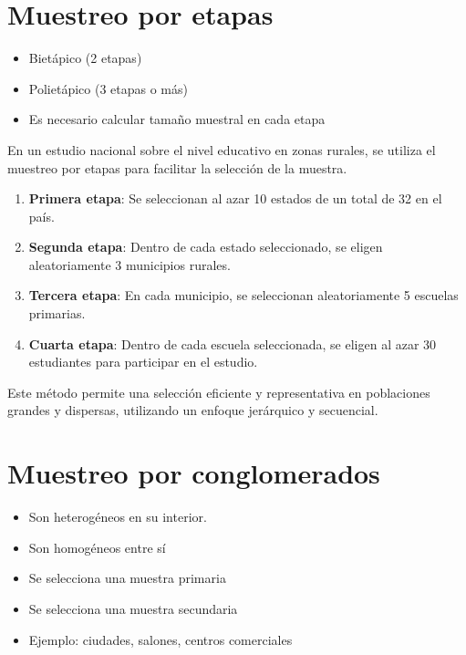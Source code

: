 \documentclass[
  letterpaper,
  DIV=11,
  numbers=noendperiod]{scrreprt}
\providecommand{\tightlist}{%
  \setlength{\itemsep}{0pt}\setlength{\parskip}{0pt}}\usepackage{longtable,booktabs,array}
\begin{document}
\section{Muestreo por etapas}\label{muestreo-por-etapas}

\begin{itemize}
\tightlist
\item
  Bietápico (2 etapas)
\item
  Polietápico (3 etapas o más)
\item
  Es necesario calcular tamaño muestral en cada etapa
\end{itemize}

En un estudio nacional sobre el nivel educativo en zonas rurales, se
utiliza el muestreo por etapas para facilitar la selección de la
muestra.

\begin{enumerate}
\def\labelenumi{\arabic{enumi}.}
\tightlist
\item
  \textbf{Primera etapa}: Se seleccionan al azar 10 estados de un total
  de 32 en el país.
\item
  \textbf{Segunda etapa}: Dentro de cada estado seleccionado, se eligen
  aleatoriamente 3 municipios rurales.
\item
  \textbf{Tercera etapa}: En cada municipio, se seleccionan
  aleatoriamente 5 escuelas primarias.
\item
  \textbf{Cuarta etapa}: Dentro de cada escuela seleccionada, se eligen
  al azar 30 estudiantes para participar en el estudio.
\end{enumerate}

Este método permite una selección eficiente y representativa en
poblaciones grandes y dispersas, utilizando un enfoque jerárquico y
secuencial.

\section{Muestreo por conglomerados}\label{muestreo-por-conglomerados}

\begin{itemize}
\tightlist
\item
  Son heterogéneos en su interior.
\item
  Son homogéneos entre sí
\item
  Se selecciona una muestra primaria
\item
  Se selecciona una muestra secundaria
\item
  Ejemplo: ciudades, salones, centros comerciales
\end{itemize}
\end{document}
